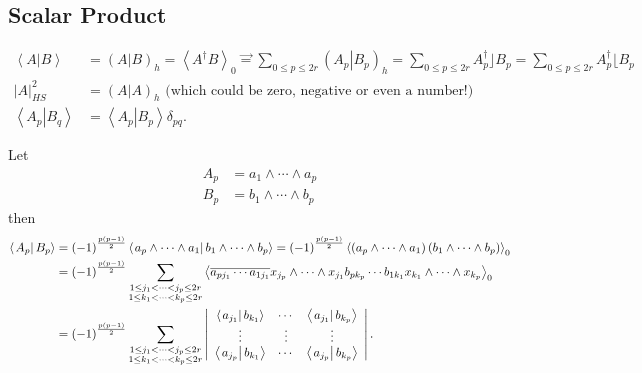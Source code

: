 \documentclass[aps,preprint]{revtex4}%
\begin{document}
\subsection{Scalar Product}%

\begin{align}
\left\langle \left.  A\right\vert B\right\rangle  &  =\left(  \left.
A\right\vert B\right)  _{h}=\left\langle A^{\dagger}B\right\rangle _{0}\vec
{=}\sum_{0\leq p\leq2r}\left(  \left.  A_{p}\right\vert B_{p}\right)
_{h}=\sum_{0\leq p\leq2r}A_{p}^{\dagger}\rfloor B_{p}=\sum_{0\leq p\leq
2r}A_{p}^{\dagger}\lfloor B_{p}\\
\left\vert A\right\vert _{HS}^{2}  &  =\left(  \left.  A\right\vert A\right)
_{h}\text{ (which could be zero, negative or even a number!)}\\
\left\langle \left.  A_{p}\right\vert B_{q}\right\rangle  &  =\left\langle
\left.  A_{p}\right\vert B_{p}\right\rangle \delta_{pq}.
\end{align}


Let
\begin{align}
A_{p}  &  =a_{1}\wedge\cdots\wedge a_{p}\\
B_{p}  &  =b_{1}\wedge\cdots\wedge b_{p}%
\end{align}
then
\begin{align}
\left\langle \left.  A_{p}\right\vert B_{p}\right\rangle  &  =\left(
-1\right)  ^{\frac{p\left(  p-1\right)  }{2}}\left\langle \left.  a_{p}%
\wedge\cdots\wedge a_{1}\right\vert b_{1}\wedge\cdots\wedge b_{p}\right\rangle
=\left(  -1\right)  ^{\frac{p\left(  p-1\right)  }{2}}\left\langle \left(
a_{p}\wedge\cdots\wedge a_{1}\right)  \left(  b_{1}\wedge\cdots\wedge
b_{p}\right)  \right\rangle _{0}\\
&  =\left(  -1\right)  ^{\frac{p\left(  p-1\right)  }{2}}\sum_{\substack{1\leq
j_{1}<\cdots<j_{p}\leq2r\\1\leq k_{1}<\cdots<k_{p}\leq2r}}\left\langle
\overline{a_{pj_{1}}\cdots a_{1j_{1}}}x_{j_{p}}\wedge\cdots\wedge x_{j_{1}%
}b_{pk_{p}}\cdots b_{1k_{1}}x_{k_{1}}\wedge\cdots\wedge x_{k_{p}}\right\rangle
_{0}\\
&  =\left(  -1\right)  ^{\frac{p\left(  p-1\right)  }{2}}\sum_{\substack{1\leq
j_{1}<\cdots<j_{p}\leq2r\\1\leq k_{1}<\cdots<k_{p}\leq2r}}\left\vert
\begin{array}
[c]{ccc}%
\left\langle \left.  a_{j_{1}}\right\vert b_{k_{1}}\right\rangle  & \cdots &
\left\langle \left.  a_{j_{1}}\right\vert b_{k_{p}}\right\rangle \\
\vdots & \vdots & \vdots\\
\left\langle \left.  a_{j_{p}}\right\vert b_{k_{1}}\right\rangle  & \cdots &
\left\langle \left.  a_{j_{p}}\right\vert b_{k_{p}}\right\rangle
\end{array}
\right\vert .
\end{align}
\end{document}
